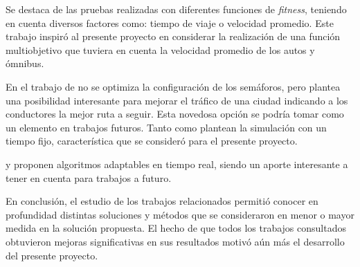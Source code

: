 Se destaca de \citet{Sanchez2010} las pruebas realizadas con diferentes funciones de \emph{fitness}, teniendo en cuenta diversos factores como: tiempo de viaje o velocidad promedio. Este trabajo inspiró al presente proyecto en considerar la realización de una función multiobjetivo que tuviera en cuenta la velocidad promedio de los autos y ómnibus.

En el trabajo de \citet{Stolfi2012} no se optimiza la configuración de los semáforos, pero plantea una posibilidad interesante para mejorar el tráfico de una ciudad indicando a los conductores la mejor ruta a seguir. Esta novedosa opción se podría tomar como un elemento en trabajos futuros. Tanto \citet{Teo2010} como \citet{Stolfi2012} plantean la simulación con un tiempo fijo, característica que se consideró para el presente proyecto.

\citet{Montana1996} y \citet{Vogel2000}  proponen algoritmos adaptables en tiempo real, siendo un aporte interesante a tener en cuenta para trabajos a futuro.

En conclusión, el estudio de los trabajos relacionados permitió conocer en profundidad distintas soluciones y métodos que se consideraron en menor o mayor medida en la solución propuesta. El hecho de que todos los trabajos consultados obtuvieron mejoras significativas en sus resultados motivó aún más el desarrollo del presente proyecto.








